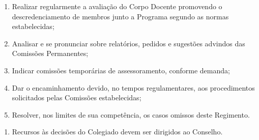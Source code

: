\documentclass{article}
\newcommand{\singleitem}{\item[Parágrafo Único.]}
\newcommand{\grupoMenor}{Colegiado\xspace}
\newcommand{\grupoMaior}{Conselho\xspace}
\begin{document}
\begin{enumerate}
\begin{enumerate}[label=\Roman*]
		\item Realizar regularmente a avaliação do Corpo Docente promovendo o descredenciamento de membros junto a Programa segundo as normas estabelecidas;
		\item Analisar e se pronunciar sobre relatórios, pedidos e sugestões advindos das Comissões Permanentes;
		\item Indicar comissões temporárias de assessoramento, conforme demanda;
		\item Dar o encaminhamento devido, no tempos regulamentares, aos procedimentos solicitados pelas Comissões estabelecidas;
		\item Resolver, nos limites de sua competência, os casos omissos deste Regimento.
	\end{enumerate}

	\begin{enumerate}
		\singleitem Recursos às decisões do \grupoMenor devem ser dirigidos ao \grupoMaior.
	\end{enumerate}
\end{enumerate}
\end{document}
